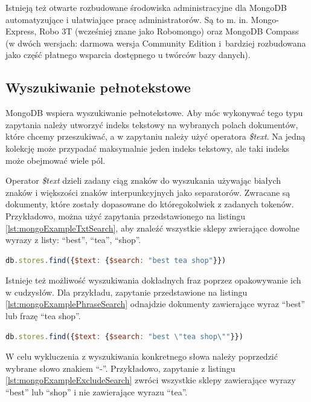 Istnieją też otwarte rozbudowane środowiska administracyjne dla MongoDB automatyzujące i ułatwiające pracę administratorów.
Są to m. in. Mongo-Express, Robo 3T (wcześniej znane jako Robomongo) oraz MongoDB Compass (w dwóch wersjach: darmowa wersja Community Edition i~bardziej rozbudowana jako część płatnego wsparcia dostępnego u twórców bazy danych).

\subsection{Wyszukiwanie pełnotekstowe}

MongoDB wspiera wyszukiwanie pełnotekstowe.
Aby móc wykonywać tego typu zapytania należy utworzyć indeks tekstowy na wybranych polach dokumentów, które chcemy przeszukiwać, a w zapytaniu należy użyć operatora \textit{\$text}.
Na jedną kolekcję może przypadać maksymalnie jeden indeks tekstowy, ale taki indeks może obejmować wiele pól.

Operator \textit{\$text} dzieli zadany ciąg znaków do wyszukania używając białych znaków i większości znaków interpunkcyjnych jako separatorów.
Zwracane są dokumenty, które zostały dopasowane do któregokolwiek z zadanych tokenów.
Przykładowo, można użyć zapytania przedstawionego na listingu \ref{lst:mongoExampleTxtSearch}, aby znaleźć wszystkie sklepy zwierające dowolne wyrazy z listy: \enquote{best}, \enquote{tea}, \enquote{shop}.

\begin{lstlisting}[language=JavaScript,caption={Zapytanie wykonujące wyszukiwanie pełnotekstowe},label={lst:mongoExampleTxtSearch}]
db.stores.find({$text: {$search: "best tea shop"}})
\end{lstlisting}

Istnieje też możliwość wyszukiwania dokładnych fraz poprzez opakowywanie ich w cudzysłów. 
Dla przykładu, zapytanie przedstawione na listingu \ref{lst:mongoExamplePhraseSearch}
odnajdzie dokumenty zawierające wyraz \enquote{best} lub frazę \enquote{tea shop}.

\begin{lstlisting}[language=JavaScript,
caption={Zapytanie dopasowujące dokładną frazę},
label={lst:mongoExamplePhraseSearch}]
db.stores.find({$text: {$search: "best \"tea shop\""}})
\end{lstlisting}

W celu wykluczenia z wyszukiwania konkretnego słowa należy poprzedzić wybrane słowo znakiem \enquote{-}.
Przykładowo, zapytanie z listingu \ref{lst:mongoExampleExcludeSearch} zwróci wszystkie sklepy zawierające wyrazy \enquote{best} lub \enquote{shop} i nie zawierające wyrazu \enquote{tea}.

